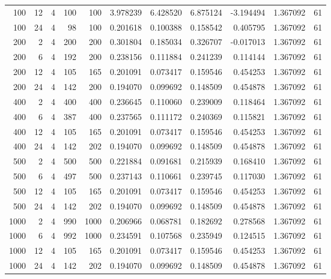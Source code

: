 \begin{table}
\begin{tabular}{rrrrrrrrrrr}
100 & 12 & 4 & 100 & 100 & 3.978239 & 6.428520 & 6.875124 & -3.194494 & 1.367092 & 61 \\
100 & 24 & 4 & 98 & 100 & 0.201618 & 0.100388 & 0.158542 & 0.405795 & 1.367092 & 61 \\
200 & 2 & 4 & 200 & 200 & 0.301804 & 0.185034 & 0.326707 & -0.017013 & 1.367092 & 61 \\
200 & 6 & 4 & 192 & 200 & 0.238156 & 0.111884 & 0.241239 & 0.114144 & 1.367092 & 61 \\
200 & 12 & 4 & 105 & 165 & 0.201091 & 0.073417 & 0.159546 & 0.454253 & 1.367092 & 61 \\
200 & 24 & 4 & 142 & 200 & 0.194070 & 0.099692 & 0.148509 & 0.454878 & 1.367092 & 61 \\
400 & 2 & 4 & 400 & 400 & 0.236645 & 0.110060 & 0.239009 & 0.118464 & 1.367092 & 61 \\
400 & 6 & 4 & 387 & 400 & 0.237565 & 0.111172 & 0.240369 & 0.115821 & 1.367092 & 61 \\
400 & 12 & 4 & 105 & 165 & 0.201091 & 0.073417 & 0.159546 & 0.454253 & 1.367092 & 61 \\
400 & 24 & 4 & 142 & 202 & 0.194070 & 0.099692 & 0.148509 & 0.454878 & 1.367092 & 61 \\
500 & 2 & 4 & 500 & 500 & 0.221884 & 0.091681 & 0.215939 & 0.168410 & 1.367092 & 61 \\
500 & 6 & 4 & 497 & 500 & 0.237143 & 0.110661 & 0.239745 & 0.117030 & 1.367092 & 61 \\
500 & 12 & 4 & 105 & 165 & 0.201091 & 0.073417 & 0.159546 & 0.454253 & 1.367092 & 61 \\
500 & 24 & 4 & 142 & 202 & 0.194070 & 0.099692 & 0.148509 & 0.454878 & 1.367092 & 61 \\
1000 & 2 & 4 & 990 & 1000 & 0.206966 & 0.068781 & 0.182692 & 0.278568 & 1.367092 & 61 \\
1000 & 6 & 4 & 992 & 1000 & 0.234591 & 0.107568 & 0.235949 & 0.124515 & 1.367092 & 61 \\
1000 & 12 & 4 & 105 & 165 & 0.201091 & 0.073417 & 0.159546 & 0.454253 & 1.367092 & 61 \\
1000 & 24 & 4 & 142 & 202 & 0.194070 & 0.099692 & 0.148509 & 0.454878 & 1.367092 & 61 \\
\bottomrule
\end{tabular}
\end{table}
